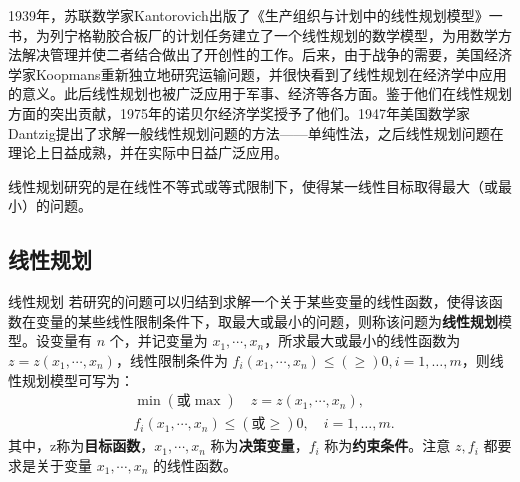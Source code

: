 
1939年，苏联数学家Kantorovich出版了《生产组织与计划中的线性规划模型》一书，为列宁格勒胶合板厂的计划任务建立了一个线性规划的数学模型，为用数学方法解决管理并使二者结合做出了开创性的工作。后来，由于战争的需要，美国经济学家Koopmans重新独立地研究运输问题，并很快看到了线性规划在经济学中应用的意义。此后线性规划也被广泛应用于军事、经济等各方面。鉴于他们在线性规划方面的突出贡献，1975年的诺贝尔经济学奖授予了他们。1947年美国数学家Dantzig提出了求解一般线性规划问题的方法——单纯性法，之后线性规划问题在理论上日益成熟，并在实际中日益广泛应用。

线性规划研究的是在线性不等式或等式限制下，使得某一线性目标取得最大（或最小）的问题。

\subsection{线性规划}

\begin{definition}{线性规划}
若研究的问题可以归结到求解一个关于某些变量的线性函数，使得该函数在变量的某些线性限制条件下，取最大或最小的问题，则称该问题为\textbf{线性规划}模型。设变量有 $n$ 个，并记变量为 $x_1,\cdots,x_n$，所求最大或最小的线性函数为 $z=z(x_1,\cdots,x_n)$，线性限制条件为 $f_i(x_1,\cdots,x_n)\leq(\geq) 0,i=1,\dots,m$，则线性规划模型可写为：
\begin{equation}
\begin{aligned}
&\min(\text{或}\max) \quad z=z(x_1,\cdots ,x_n),\\
&f_i(x_1,\cdots,x_n)\leq(\text{或}\geq) 0,\quad i=1,\dots,m.
\end{aligned}~
\end{equation}
其中，z称为\textbf{目标函数}，$x_1,\cdots,x_n$ 称为\textbf{决策变量}，$f_i$ 称为\textbf{约束条件}。注意 $z,f_i$ 都要求是关于变量 $x_1,\cdots,x_n$ 的线性函数。
\end{definition}













